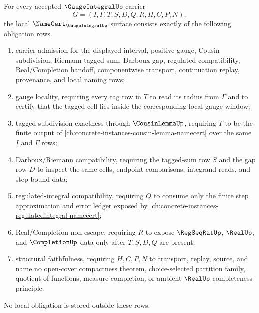 \begin{theorem}
\label{thm:gauge-integral-namecert-obligations}
For every accepted $\GaugeIntegralUp$ carrier
$$
G=(I,\Gamma,T,S,D,Q,R,H,C,P,N),
$$
the local $\NameCert_{\GaugeIntegralUp}$ surface consists exactly of the following obligation rows.
\begin{enumerate}
\item carrier admission for the displayed interval, positive gauge, Cousin subdivision, Riemann tagged sum, Darboux gap, regulated compatibility, Real/Completion handoff, componentwise transport, continuation replay, provenance, and local naming rows;
\item gauge locality, requiring every tag row in $T$ to read its radius from $\Gamma$ and to certify that the tagged cell lies inside the corresponding local gauge window;
\item tagged-subdivision exactness through $\CousinLemmaUp$, requiring $T$ to be the finite output of \autoref{ch:concrete-instances-cousin-lemma-namecert} over the same $I$ and $\Gamma$ rows;
\item Darboux/Riemann compatibility, requiring the tagged-sum row $S$ and the gap row $D$ to inspect the same cells, endpoint comparisons, integrand reads, and step-bound data;
\item regulated-integral compatibility, requiring $Q$ to consume only the finite step approximation and error ledger exposed by \autoref{ch:concrete-instances-regulatedintegral-namecert};
\item Real/Completion non-escape, requiring $R$ to expose $\RegSeqRatUp$, $\RealUp$, and $\CompletionUp$ data only after $T,S,D,Q$ are present;
\item structural faithfulness, requiring $H,C,P,N$ to transport, replay, source, and name no open-cover compactness theorem, choice-selected partition family, quotient of functions, measure completion, or ambient $\RealUp$ completeness principle.
\end{enumerate}
No local obligation is stored outside these rows.
\end{theorem}
